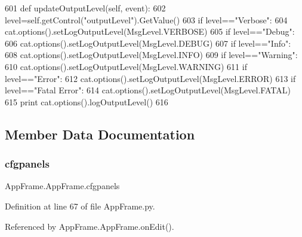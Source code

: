 \begin{DoxyCode}
601     \textcolor{keyword}{def }updateOutputLevel(self, event):
602         level=self.getControl(\textcolor{stringliteral}{"outputLevel"}).GetValue()
603         \textcolor{keywordflow}{if} level==\textcolor{stringliteral}{"Verbose"}:
604             cat.options().setLogOutputLevel(MsgLevel.VERBOSE)
605         \textcolor{keywordflow}{if} level==\textcolor{stringliteral}{"Debug"}:
606             cat.options().setLogOutputLevel(MsgLevel.DEBUG)            
607         \textcolor{keywordflow}{if} level==\textcolor{stringliteral}{"Info"}:
608             cat.options().setLogOutputLevel(MsgLevel.INFO)
609         \textcolor{keywordflow}{if} level==\textcolor{stringliteral}{"Warning"}:
610             cat.options().setLogOutputLevel(MsgLevel.WARNING)            
611         \textcolor{keywordflow}{if} level==\textcolor{stringliteral}{"Error"}:
612             cat.options().setLogOutputLevel(MsgLevel.ERROR)            
613         \textcolor{keywordflow}{if} level==\textcolor{stringliteral}{"Fatal Error"}:
614             cat.options().setLogOutputLevel(MsgLevel.FATAL)
615         \textcolor{keywordflow}{print} cat.options().logOutputLevel()
616 
\end{DoxyCode}


\subsection{Member Data Documentation}
\mbox{\label{classAppFrame_1_1AppFrame_af65e80bd42cb4aac490e05ad3258279e}} 
\subsubsection{\texorpdfstring{cfgpanels}{cfgpanels}}
{\footnotesize\ttfamily App\+Frame.\+App\+Frame.\+cfgpanels}



Definition at line 67 of file App\+Frame.\+py.



Referenced by App\+Frame.\+App\+Frame.\+on\+Edit().

\mbox{\label{classAppFrame_1_1AppFrame_a756e6204d661babaec7a23ee50a745d1}} 
